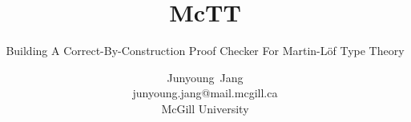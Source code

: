 \documentclass[letterpaper,10pt,aspectratio=169,dvipsnames]{beamer}
\title[McTT: Building A Correct-By-Construction Proof Checker For Martin-L\"of Type Theory]{McTT}
\subtitle{Building A Correct-By-Construction Proof Checker For Martin-L\"of Type Theory}
\author[Junyoung Jang]{\parbox{10em}{\centering Junyoung~Jang\\{}{\scriptsize junyoung.jang@mail.mcgill.ca}\\{}{\scriptsize McGill University}}}
\date{}
\begin{document}
\begin{frame}[plain]
  \titlepage
\end{frame}
\end{document}
